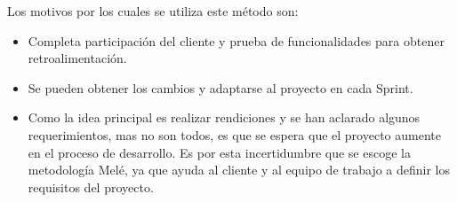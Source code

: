 Los motivos por los cuales se utiliza este método son:

\begin{itemize}
	\item Completa participación del cliente y prueba de funcionalidades para obtener retroalimentación.

	\item Se pueden obtener los cambios y adaptarse al proyecto en cada Sprint.

	\item Como la idea principal es realizar rendiciones y se han aclarado algunos requerimientos, mas no son todos, es que se espera que el proyecto aumente en el proceso de desarrollo. Es por esta incertidumbre que se escoge la metodología Melé, ya que ayuda al cliente y al equipo de trabajo a definir los requisitos del proyecto.
\end{itemize}

